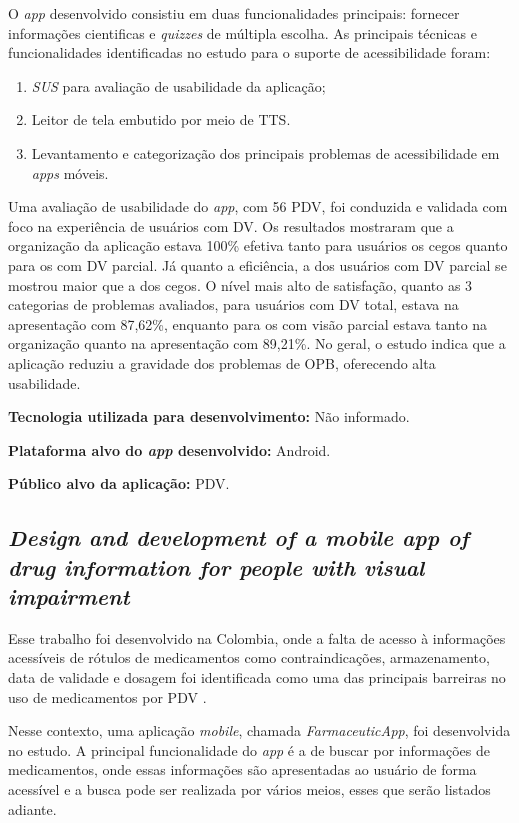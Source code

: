 O \emph{app} desenvolvido consistiu em duas funcionalidades principais: fornecer informações cientificas e \emph{quizzes} de múltipla escolha.
As principais técnicas e funcionalidades identificadas no estudo para o suporte de acessibilidade foram:

\begin{enumerate}
    \item \emph{SUS} para avaliação de usabilidade da aplicação;
    \item Leitor de tela embutido por meio de TTS\@.
    \item Levantamento e categorização dos principais problemas de acessibilidade em \emph{apps} móveis.
\end{enumerate}

Uma avaliação de usabilidade do \emph{app}, com 56 PDV, foi conduzida e validada com foco na experiência de usuários com DV\@.
Os resultados mostraram que a organização da aplicação estava 100\% efetiva tanto para usuários os cegos quanto para os com DV parcial.
Já quanto a eficiência, a dos usuários com DV parcial se mostrou maior que a dos cegos.
O nível mais alto de satisfação, quanto as 3 categorias de problemas avaliados, para usuários com DV total, estava na apresentação com 87,62\%, enquanto para os com visão parcial estava tanto na organização quanto na apresentação com 89,21\%.
No geral, o estudo indica que a aplicação reduziu a gravidade dos problemas de OPB, oferecendo alta usabilidade.

\textbf{Tecnologia utilizada para desenvolvimento:} Não informado.

\textbf{Plataforma alvo do \emph{app} desenvolvido:} Android.

\textbf{Público alvo da aplicação:} PDV\@.

\subsection{\emph{Design and development of a mobile app of drug information for people with visual impairment}}

Esse trabalho foi desenvolvido na Colombia, onde a falta de acesso à informações acessíveis
de rótulos de medicamentos como contraindicações, armazenamento, data de validade e dosagem foi identificada como uma
das principais barreiras no uso de medicamentos por PDV \cite{Amariles2020}.

Nesse contexto, uma aplicação \emph{mobile}, chamada \emph{FarmaceuticApp}, foi desenvolvida no estudo.
A principal funcionalidade do \emph{app} é a de buscar por informações de medicamentos, onde essas informações são apresentadas ao usuário de forma acessível e a busca pode ser realizada por vários meios, esses que serão listados adiante.

